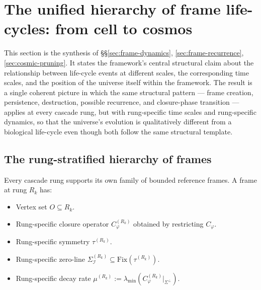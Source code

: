 \documentclass[11pt]{article}
\theoremstyle{plain}
\theoremstyle{definition}
\theoremstyle{remark}
\newcommand{\Fix}{\mathrm{Fix}}
\newcommand{\Ical}{\mathcal{I}}
\newcommand{\Cph}{C_\varphi}
\begin{document}
\section{The unified hierarchy of frame life-cycles: from cell to cosmos}\label{sec:hierarchy}

This section is the synthesis of \S\S\ref{sec:frame-dynamics}, \ref{sec:frame-recurrence}, \ref{sec:cosmic-pruning}. It states the framework's central structural claim about the relationship between life-cycle events at different scales, the corresponding time scales, and the position of the universe itself within the framework. The result is a single coherent picture in which the same structural pattern --- frame creation, persistence, destruction, possible recurrence, and closure-phase transition --- applies at every cascade rung, but with rung-specific time scales and rung-specific dynamics, so that the universe's evolution is qualitatively different from a biological life-cycle even though both follow the same structural template.

\subsection{The rung-stratified hierarchy of frames}

Every cascade rung supports its own family of bounded reference frames. A frame at rung $R_k$ has:

\begin{itemize}[leftmargin=2em]
\item Vertex set $O \subseteq R_k$.
\item Rung-specific closure operator $\Cph^{(R_k)}$ obtained by restricting $\Cph$.
\item Rung-specific symmetry $\tau^{(R_k)}$.
\item Rung-specific zero-line $\Sigma_\Ical^{(R_k)} \subseteq \Fix(\tau^{(R_k)})$.
\item Rung-specific decay rate $\mu^{(R_k)} := \lambda_{\min}(\Cph^{(R_k)}|_{\Sigma^\perp})$.
\end{itemize}
\end{document}

